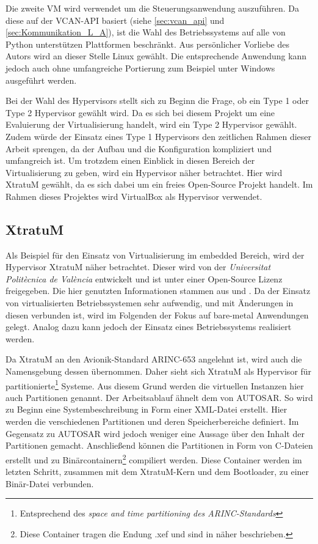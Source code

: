 \documentclass[
  a4paper,					    %
  twoside,
  DIV=calc,     				%
  bibliography=totoc,
  cleardoublepage=empty,
  ngerman,     					%
  final       					%
]{scrbook}
\begin{document}
Die zweite VM wird verwendet um die Steuerungsanwendung auszuführen. Da diese auf der VCAN-API basiert (siehe \ref{sec:vcan_api} und \ref{sec:Kommunikation_L_A}), ist die Wahl des Betriebssystems auf alle von Python unterstützen Plattformen beschränkt. Aus persönlicher Vorliebe des Autors wird an dieser Stelle Linux gewählt. Die entsprechende Anwendung kann jedoch auch ohne umfangreiche Portierung zum Beispiel unter Windows ausgeführt werden.

Bei der Wahl des Hypervisors stellt sich zu Beginn die Frage, ob ein Type 1 oder Type 2 Hypervisor gewählt wird. Da es sich bei diesem Projekt um eine Evaluierung der Virtualisierung handelt, wird ein Type 2 Hypervisor gewählt. Zudem würde der Einsatz eines Type 1 Hypervisors den zeitlichen Rahmen dieser Arbeit sprengen, da der Aufbau und die Konfiguration kompliziert und umfangreich ist. Um trotzdem einen Einblick in diesen Bereich der Virtualisierung zu geben, wird ein Hypervisor näher betrachtet. Hier wird XtratuM gewählt, da es sich dabei um ein freies Open-Source Projekt handelt. Im Rahmen dieses Projektes wird VirtualBox als Hypervisor verwendet.

\subsection{XtratuM}
\label{sec:xtratum}
Als Beispiel für den Einsatz von Virtualisierung im embedded Bereich, wird der Hypervisor XtratuM näher betrachtet. Dieser wird von der \emph{Universitat Politècnica de València} entwickelt und ist unter einer Open-Source Lizenz freigegeben. Die hier genutzten Informationen stammen aus \cite{xm:usermanual} und \cite{xm:reference}. Da der Einsatz von virtualisierten Betriebssystemen sehr aufwendig, und mit Änderungen in diesen verbunden ist, wird im Folgenden der Fokus auf bare-metal Anwendungen gelegt. Analog dazu kann jedoch der Einsatz eines Betriebssystems realisiert werden.

Da XtratuM an den Avionik-Standard ARINC-653 angelehnt ist, wird auch die Namensgebung dessen übernommen. Daher sieht sich XtratuM als Hypervisor für partitionierte\footnote{Entsprechend des \emph{space and time partitioning des ARINC-Standards}} Systeme. Aus diesem Grund werden die virtuellen Instanzen hier auch Partitionen genannt. Der Arbeitsablauf ähnelt dem von AUTOSAR. So wird zu Beginn eine Systembeschreibung in Form einer XML-Datei erstellt. Hier werden die verschiedenen Partitionen und deren Speicherbereiche definiert. Im Gegensatz zu AUTOSAR wird jedoch weniger eine Aussage über den Inhalt der Partitionen gemacht. Anschließend können die Partitionen in Form von C-Dateien erstellt und zu Binärcontainern\footnote{Diese Container tragen die Endung .xef und sind in \cite[Seite 68]{xm:usermanual} näher beschrieben.} compiliert werden. Diese Container werden im letzten Schritt, zusammen mit dem XtratuM-Kern und dem Bootloader, zu einer Binär-Datei verbunden.
\end{document}
